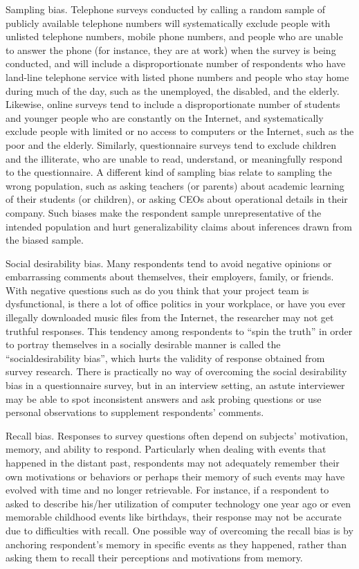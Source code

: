 Sampling bias. Telephone surveys conducted by calling a random sample of publicly available telephone numbers will systematically exclude people with unlisted telephone numbers, mobile phone numbers, and people who are unable to answer the phone (for instance, they are at work) when the survey is being conducted, and will include a disproportionate number of respondents who have land-line telephone service with listed phone numbers and people who stay home during much of the day, such as the unemployed, the disabled, and the elderly. Likewise, online surveys tend to include a disproportionate number of students and younger people who are constantly on the Internet, and systematically exclude people with limited or no access to computers or the Internet, such as the poor and the elderly. Similarly, questionnaire surveys tend to exclude children and the illiterate, who are unable to read, understand, or meaningfully respond to the questionnaire. A different kind of sampling bias relate to sampling the wrong population, such as asking teachers (or parents) about academic learning of their students (or children), or asking CEOs about operational details in their company. Such biases make the respondent sample unrepresentative of the intended population and hurt generalizability claims about inferences drawn from the biased sample.

Social desirability bias. Many respondents tend to avoid negative opinions or embarrassing comments about themselves, their employers, family, or friends. With negative questions such as do you think that your project team is dysfunctional, is there a lot of office politics in your workplace, or have you ever illegally downloaded music files from the Internet, the researcher may not get truthful responses. This tendency among respondents to “spin the truth” in order to portray themselves in a socially desirable manner is called the “socialdesirability bias”, which hurts the validity of response obtained from survey research. There is practically no way of overcoming the social desirability bias in a questionnaire survey, but in an interview setting, an astute interviewer may be able to spot inconsistent answers and ask probing questions or use personal observations to supplement respondents’ comments.

Recall bias. Responses to survey questions often depend on subjects’ motivation, memory, and ability to respond. Particularly when dealing with events that happened in the distant past, respondents may not adequately remember their own motivations or behaviors or perhaps their memory of such events may have evolved with time and no longer retrievable. For instance, if a respondent to asked to describe his/her utilization of computer technology one year ago or even memorable childhood events like birthdays, their response may not be accurate due to difficulties with recall. One possible way of overcoming the recall bias is by anchoring respondent’s memory in specific events as they happened, rather than asking them to recall their perceptions and motivations from memory.


